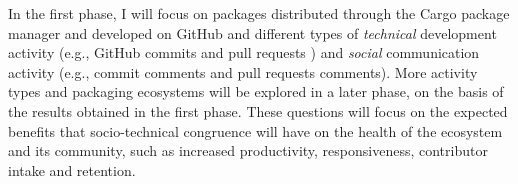In the first phase, I will focus on packages distributed through the Cargo package manager and developed on GitHub %
and different types of \emph{technical} development activity (e.g., GitHub commits and pull requests%
) and \emph{social} communication activity %
(e.g., commit comments and pull requests comments). 
%
More %
activity types and packaging 
ecosystems will be explored in a later phase, on the basis of the results obtained %
in the first phase. %
These questions will focus on the expected benefits that socio-technical congruence will have on the health of the ecosystem and its community, such as increased productivity, responsiveness, contributor intake and retention.